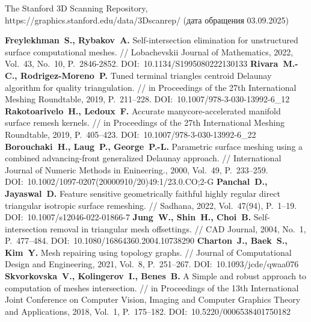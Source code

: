 \begin{thebibliography}{99}
 The Stanford 3D Scanning Repository, https://graphics.stanford.edu/data/3Dscanrep/ (дата обращения 03.09.2025)


\textbf{Freylekhman~S., Rybakov~A.} Self-intersection elimination for unstructured surface computational meshes. // Lobachevskii Journal of Mathematics, 2022, Vol.~43, No.~10, P.~2846-2852. DOI:~10.1134/S1995080222130133
\textbf{Rivara~M.-C., Rodrigez-Moreno~P.} Tuned terminal triangles centroid Delaunay algorithm for quality triangulation. // in Proceedings of the 27th International Meshing Roundtable, 2019, P.~211–228. DOI:~10.1007/978-3-030-13992-6\_12
\textbf{Rakotoarivelo~H., Ledoux~F.} Accurate manycore-accelerated manifold surface remesh kernels. // in Proceedings of the 27th International Meshing Roundtable, 2019, P.~405–423. DOI:~10.1007/978-3-030-13992-6\_22
\textbf{Borouchaki~H., Laug~P., George~P.-L.} Parametric surface meshing using a combined advancing-front generalized Delaunay approach. // International Journal of Numeric Methods in Enineering., 2000, Vol.~49, P.~233–259. DOI:~10.1002/1097-0207(20000910/20)49:1/23.0.CO;2-G
\textbf{Panchal~D., Jayaswal~D.} Feature sensitive geometrically faithful highly regular direct triangular isotropic surface remeshing. // Sadhana, 2022, Vol.~47(94), P.~1–19. DOI:~10.1007/s12046-022-01866-7
\textbf{Jung~W., Shin~H., Choi~B.} Self-intersection removal in triangular mesh offsettings. // CAD Journal, 2004, No.~1, P.~477–484. DOI:~10.1080/16864360.2004.10738290
\textbf{Charton~J., Baek~S., Kim~Y.} Mesh repairing using topology graphs. // Journal of Computational Design and Engineering, 2021, Vol.~8, P.~251–267. DOI:~10.1093/jcde/qwaa076
\textbf{Skvorkovska~V., Kolingerov~I., Benes~B.} A Simple and robust approach to computation of meshes intersection. // in Proceedings of the 13th International Joint Conference on Computer Vision, Imaging and Computer Graphics Theory and Applications, 2018, Vol.~1, P.~175–182. DOI:~10.5220/0006538401750182


\end{thebibliography}
